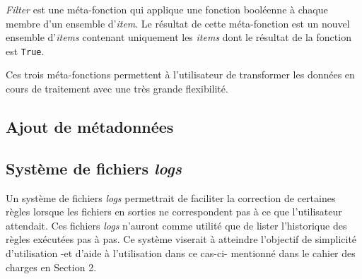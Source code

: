 		\textit{Filter} est une méta-fonction qui applique une fonction booléenne à chaque membre d'un ensemble d'\textit{item}. Le résultat de cette méta-fonction est un nouvel ensemble d'\textit{items} contenant uniquement les \textit{items} dont le résultat de la fonction est \texttt{True}.
		
		Ces trois méta-fonctions permettent à l'utilisateur de transformer les données en cours de traitement avec une très grande flexibilité.
	
	\subsection{Ajout de métadonnées}
	
	\subsection{Système de fichiers \textit{logs}}
	
		Un système de fichiers \textit{logs} permettrait de faciliter la correction de certaines règles lorsque les fichiers en sorties ne correspondent pas à ce que l'utilisateur attendait. Ces fichiers \textit{logs} n'auront comme utilité que de lister l'historique des règles exécutées pas à pas. Ce système viserait à atteindre l'objectif de simplicité d'utilisation -et d'aide à l'utilisation dans ce cas-ci- mentionné dans le cahier des charges en Section 2.